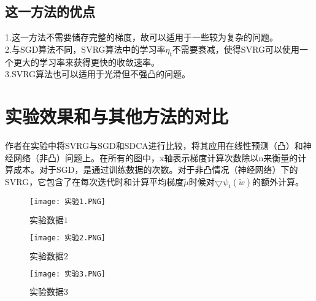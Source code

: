 \documentclass[12pt, a4paper, oneside]{ctexart}
\begin{document}
\subsection{这一方法的优点}

1.这一方法不需要储存完整的梯度，故可以适用于一些较为复杂的问题。
\\[4pt]
2.与SGD算法不同，SVRG算法中的学习率$\eta_t$不需要衰减，使得SVRG可以使用一个更大的学习率来获得更快的收敛速率。
\\[4pt]
3.SVRG算法也可以适用于光滑但不强凸的问题。
\\[8pt]

\newpage

\section{实验效果和与其他方法的对比}


作者在实验中将SVRG与SGD和SDCA进行比较，将其应用在线性预测（凸）和神经网络（非凸）问题上。在所有的图中，x轴表示梯度计算次数除以n来衡量的计算成本。对于SGD，是通过训练数据的次数。对于非凸情况（神经网络）下的SVRG，它包含了在每次迭代时和计算平均梯度$\tilde{\mu}$时候对$\bigtriangledown \psi_i(\tilde{w})$的额外计算。

\begin{figure}[htbp]
    \centering
    \texttt{[image: 实验1.PNG]}
    \caption{$实验数据1$}
\end{figure}

\begin{figure}[htbp]
    \centering
    \texttt{[image: 实验2.PNG]}
    \caption{$实验数据2$}
\end{figure}

\begin{figure}[htbp]
    \centering
    \texttt{[image: 实验3.PNG]}
    \caption{$实验数据3$}
\end{figure}
\end{document}
